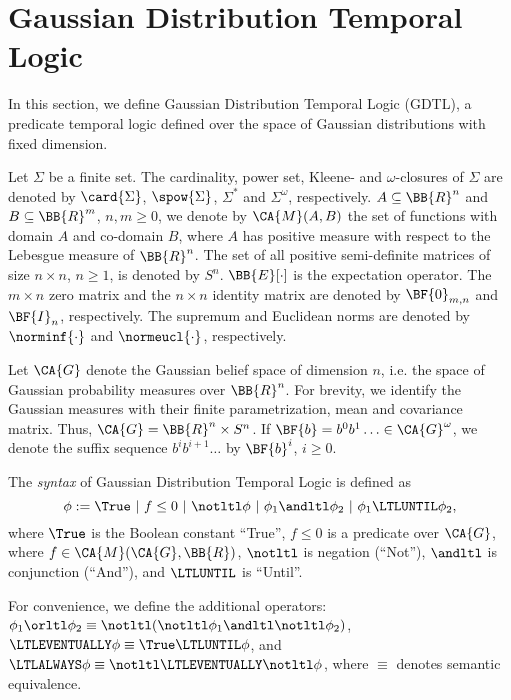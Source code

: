 \section{Gaussian Distribution Temporal Logic}
\label{sec:gdtl}
In this section, we define Gaussian Distribution Temporal Logic (GDTL),
a predicate temporal logic defined over the space of Gaussian
distributions with fixed dimension.

\smallskip
{}
Let $\Sigma$ be a finite set. The cardinality,
power set, Kleene- and $\omega$-closures
of $\Sigma$ are denoted by $\card{\Sigma}$,
$\spow{\Sigma}$, $\Sigma^*$ and $\Sigma^\omega$,
respectively.
$A \subseteq \BB{R}^n$ and $B \subseteq \BB{R}^m$,
$n, m \geq 0$, we denote by $\CA{M}(A, B)$ the set of
functions with domain $A$ and co-domain $B$, where $A$ has positive measure with
respect to the Lebesgue measure of $\BB{R}^n$.
The set of all positive semi-definite matrices of size
$n \times n$, $n \geq 1$, is denoted by $S^n$.
$\BB{E}[\cdot]$ is the expectation operator.
The $m \times n$ zero matrix and
the $n \times n$ identity matrix are denoted by
$\BF{0}_{m, n}$ and $\BF{I}_n$, respectively.
The supremum and Euclidean norms are denoted by
$\norminf{\cdot}$ and $\normeucl{\cdot}$, respectively.

Let $\CA{G}$ denote the Gaussian belief space
of dimension $n$, i.e. the space of Gaussian
probability measures over $\BB{R}^n$.
For brevity, we identify the Gaussian measures
with their finite parametrization, mean and
covariance matrix. Thus,
$\CA{G} =  \BB{R}^n \times  S^n$.
If $\BF{b} = b^0b^1 \ldots \in \CA{G}^{\omega}$,
we denote the suffix sequence $b^i b^{i+1} \ldots$ by
$\BF{b}^i$, $i \geq 0$.

\begin{definition}
\label{def:gdtl-syntax}
The {\em syntax} of Gaussian Distribution
Temporal Logic is defined as
\begin{equation*}
 \phi :=  \True \ |\ f \leq 0 \ |\ \notltl \phi \ |\ \phi_1 \andltl \phi_2 \ |\ \phi_1 \LTLUNTIL \phi_2,%
\end{equation*}
where $\True$ is the Boolean constant ``True'',
$f \leq 0$ is a predicate over $\CA{G}$, where
$f \in \CA{M}(\CA{G}, \BB{R})$,
$\notltl$ is negation (``Not''), $\andltl$ is conjunction (``And''),
and $\LTLUNTIL$ is ``Until''.
\end{definition}

For convenience, we define the additional operators:
$\phi_1 \orltl \phi_2 \equiv  \notltl (\notltl \phi_1 \andltl \notltl \phi_2)$,
$\LTLEVENTUALLY \phi \equiv \True \LTLUNTIL \phi$, and
$\LTLALWAYS \phi \equiv \notltl \LTLEVENTUALLY \notltl \phi$,
where $\equiv$ denotes semantic equivalence.

